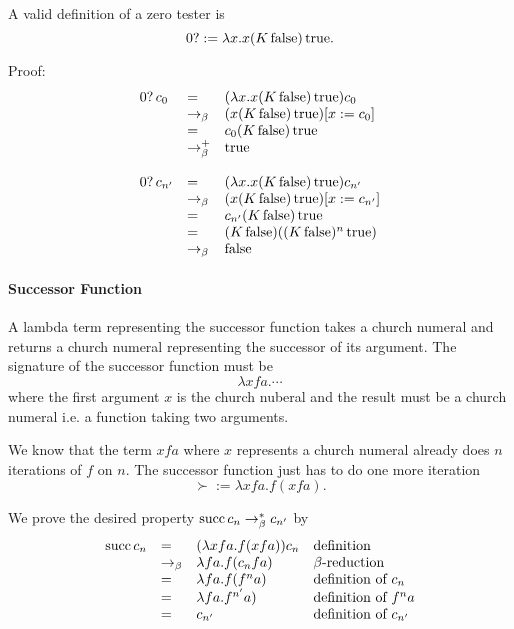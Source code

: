 A valid definition of a zero tester is
$$ 0? := \lambda x. x (K\, \text{false}) \, \text{true}.$$

Proof:
$$
\begin{array}{lll}
  0?\, c_0
  &= &(\lambda x. x (K\, \text{false}) \, \text{true}) c_0\\
  &\to_\beta & (x (K\, \text{false}) \, \text{true})[x:=c_0] \\
  &= & c_0 (K\, \text{false}) \, \text{true} \\
  &\to^+_\beta & \text{true} \\
  \\
  0?\, c_{n'}
  &=& (\lambda x. x (K\, \text{false}) \, \text{true}) c_{n'}\\
  &\to_\beta & (x (K\, \text{false}) \, \text{true})[x:=c_{n'}] \\
  &= & c_{n'} (K\, \text{false}) \, \text{true} \\
  &=&  (K\,\text{false})  ( (K\,\text{false})^n\, \text{true}) \\
  &\to_\beta & \text{false}
\end{array}
$$

\paragraph{Successor Function}

A lambda term representing the successor function takes a church numeral and
returns a church numeral representing the successor of its argument. The
signature of the successor function must be
$$ \lambda x f a. \cdots$$
where the first argument $x$ is the church nuberal and the result must be a
church numeral i.e. a function taking two arguments.

We know that the term $x f a$ where $x$ represents a church numeral already
does $n$ iterations of $f$ on $n$. The successor function just has to do one
more iteration
$$
\succ := \lambda x f a. f (x f a).
$$

We prove the desired property $\text{succ}\, c_n \to^*_\beta c_{n'}$ by
$$
\begin{array}{llll}
    \text{succ}\, c_{n} &= & (\lambda x f a. f (x f a)) c_{n} & \text{definition} \\
     & \to_\beta & \lambda f a. f (c_{n} f a) & \beta\text{-reduction} \\
     & = & \lambda f a. f (f^{n} a) & \text{definition of }c_{n} \\
     & = & \lambda f a. f^{n'} a) & \text{definition of }f^n a \\
     & = & c_{n'} & \text{definition of }c_{n'}
\end{array}
$$






